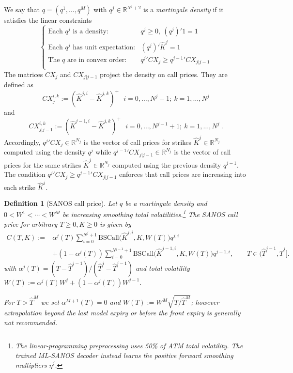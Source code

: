 \documentclass[11pt,a4paper]{article}
\newtheorem{definition}{Definition}[section]
\newcommand{\R}{\mathbb{R}}
\newcommand{\BSCall}{\mathrm{BSCall}}
\begin{document}
We say that $q=(q^1,\ldots,q^M)$ with $q^j\in\R^{N^j+2}$ is a \emph{martingale density} if
it satisfies the linear constraints
\begin{equation}\label{eq:qocnd}
    \left\{
    \begin{array}{ll}
        \mbox{Each $q^j$ is a density:} & q^j\geq 0,\ (q^j)'1 = 1 \\
        \mbox{Each $q^j$ has unit expectation:} & (q^j)' \hat K^j=1 \\
        \mbox{The $q$ are in convex order:}&
            {q^j}' CX_j \geq {q^{j-1}}' CX_{j|j-1}
            \\
    \end{array}
    \right.
\end{equation}
The matrices $CX_j$ and $CX_{j|j-1}$ project the density on call prices. They are defined as
$$
CX_j^{i,k} := (\hat K^{j,i}-\hat K^{j,k})^+ \ \ \ i=0,\ldots,N^j+1;\ k=1,\ldots,N^j 
$$
and
$$
CX_{j|j-1}^{i,k} := (\hat K^{j-1,i}-\hat K^{j,k})^+ \ \ \ i=0,\ldots,N^{j-1}+1;\ k=1,\ldots,N^j  \ . 
$$
Accordingly, ${q^j}' CX_j \in \R^{N_j}$ is the vector of call prices for strikes $\hat K^{j}\in\R^{N_j}$ computed using the density $q^j$
while ${q^{j-1}}' CX_{j|j-1} \in \R^{N_j}$ is the vector of call prices for the same strikes $\hat K^{j}\in\R^{N_j}$ computed using the previous density $q^{j-1}$.
The condition ${q^j}' CX_j \geq {q^{j-1}}' CX_{j|j-1}$ enforces that call prices are increasing into each strike $\hat K^{j}$.

\begin{definition}[SANOS call price]
\label{def:sanos}
Let $q$ be a martingale density and $0<W^1< \cdots < W^M$
be increasing smoothing total volatilities.\footnote{The linear-programming preprocessing uses 50\% of ATM total volatility. The trained ML-SANOS decoder instead learns the positive forward smoothing multipliers $\eta^j$.}
The SANOS call price 
 for arbitrary $T\geq0 ,K\geq 0$ 
is given by
\begin{equation}
  \label{eq:sanos_interp}
  \begin{aligned}
  C(T,K):={}&\alpha^j(T)\sum_{i=0}^{N^j+1}
       \BSCall\!\bigl(\hat K^{j,i},K,W(T)\bigr)q^{j,i}\\
     &+(1-\alpha^j(T))\sum_{i=0}^{N^{j-1}+1}
       \BSCall\!\bigl(\hat K^{j-1,i},K,W(T)\bigr)q^{j-1,i},
       \qquad T \in (\hat T^{j-1},\hat T^j].
  \end{aligned}
\end{equation}
with $\alpha^j(T) = (T - \hat T^{j-1})/(\hat T^j - \hat T^{j-1})$
and total volatility $W(T) := \alpha^j(T) W^j + (1-\alpha^j(T)) W^{j-1}$.

For $T>\hat T^M$ we
set $\alpha^{M+1}(T)=0$ and $W(T):=W^M\sqrt{T / \hat T^M}$; however extrapolation beyond
the last model expiry or before the front expiry is generally not recommended.
\end{definition}
\end{document}
